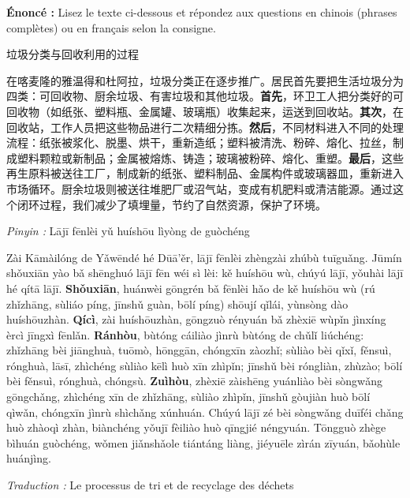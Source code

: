 \documentclass[11pt]{article}
\begin{document}
\begin{exoresolu}
\textbf{Énoncé :} Lisez le texte ci-dessous et répondez aux questions en chinois (phrases complètes) ou en français selon la consigne.

\begin{textebox}
垃圾分类与回收利用的过程

在喀麦隆的雅温得和杜阿拉，垃圾分类正在逐步推广。居民首先要把生活垃圾分为四类：可回收物、厨余垃圾、有害垃圾和其他垃圾。\textbf{首先}，环卫工人把分类好的可回收物（如纸张、塑料瓶、金属罐、玻璃瓶）收集起来，运送到回收站。\textbf{其次}，在回收站，工作人员把这些物品进行二次精细分拣。\textbf{然后}，不同材料进入不同的处理流程：纸张被浆化、脱墨、烘干，重新造纸；塑料被清洗、粉碎、熔化、拉丝，制成塑料颗粒或新制品；金属被熔炼、铸造；玻璃被粉碎、熔化、重塑。\textbf{最后}，这些再生原料被送往工厂，制成新的纸张、塑料制品、金属构件或玻璃器皿，重新进入市场循环。厨余垃圾则被送往堆肥厂或沼气站，变成有机肥料或清洁能源。通过这个闭环过程，我们减少了填埋量，节约了自然资源，保护了环境。

\textit{Pinyin :}
Lājī fēnlèi yǔ huíshōu lìyòng de guòchéng

Zài Kāmàilóng de Yǎwēndé hé Dūā'ěr, lājī fēnlèi zhèngzài zhúbù tuīguǎng. Jūmín shǒuxiān yào bǎ shēnghuó lājī fēn wéi sì lèi: kě huíshōu wù, chúyú lājī, yǒuhài lājī hé qítā lājī. \textbf{Shǒuxiān}, huánwèi gōngrén bǎ fēnlèi hǎo de kě huíshōu wù (rú zhǐzhāng, sùliáo píng, jīnshǔ guàn, bōlí píng) shōují qǐlái, yùnsòng dào huíshōuzhàn. \textbf{Qícì}, zài huíshōuzhàn, gōngzuò rényuán bǎ zhèxiē wùpǐn jìnxíng èrcì jīngxì fēnlǎn. \textbf{Ránhòu}, bùtóng cáiliào jìnrù bùtóng de chǔlǐ liúchéng: zhǐzhāng bèi jiānghuà, tuōmò, hōnggān, chóngxīn zàozhǐ; sùliào bèi qǐxǐ, fěnsuì, rónghuà, lāsī, zhìchéng sùliào kēlì huò xīn zhìpǐn; jīnshǔ bèi róngliàn, zhùzào; bōlí bèi fěnsuì, rónghuà, chóngsù. \textbf{Zuìhòu}, zhèxiē zàishēng yuánliào bèi sòngwǎng gōngchǎng, zhìchéng xīn de zhǐzhāng, sùliào zhìpǐn, jīnshǔ gòujiàn huò bōlí qìwǎn, chóngxīn jìnrù shìchǎng xúnhuán. Chúyú lājī zé bèi sòngwǎng duīféi chǎng huò zhàoqì zhàn, biànchéng yǒujī fèiliào huò qīngjié néngyuán. Tōngguò zhège bìhuán guòchéng, wǒmen jiǎnshǎole tiántáng liàng, jiéyuēle zìrán zīyuán, bǎohùle huánjìng.

\textit{Traduction :}
Le processus de tri et de recyclage des déchets


\end{textebox}
\end{exoresolu}
\end{document}
